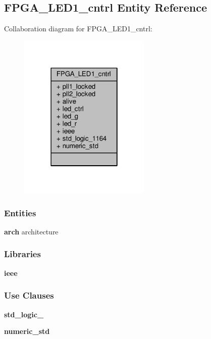 \subsection{F\+P\+G\+A\+\_\+\+L\+E\+D1\+\_\+cntrl Entity Reference}
\label{classFPGA__LED1__cntrl}


Collaboration diagram for F\+P\+G\+A\+\_\+\+L\+E\+D1\+\_\+cntrl\+:\nopagebreak
\begin{figure}[H]
\begin{center}
\leavevmode
\includegraphics[width=178pt]{de/d2e/classFPGA__LED1__cntrl__coll__graph}
\end{center}
\end{figure}
\subsubsection*{Entities}
\begin{DoxyCompactItemize}
\item 
{\bf arch} architecture
\end{DoxyCompactItemize}
\subsubsection*{Libraries}
 \begin{DoxyCompactItemize}
\item 
{\bf ieee} 
\end{DoxyCompactItemize}
\subsubsection*{Use Clauses}
 \begin{DoxyCompactItemize}
\item 
{\bf std\+\_\+logic\+\_}   
\item 
{\bf numeric\+\_\+std}   
\end{DoxyCompactItemize}
